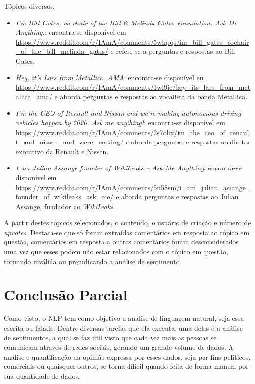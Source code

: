 Tópicos diversos.
\begin{itemize}
  \item
  \textit{I’m Bill Gates, co-chair of the Bill \& Melinda Gates Foundation. Ask
  Me Anything.}: encontra-se disponível em
  \url{https://www.reddit.com/r/IAmA/comments/5whpqs/im_bill_gates_cochair_of_the_bill_melinda_gates/}
  e refere-se a perguntas e respostas ao Bill Gates.
  \item
  \textit{Hey, it's Lars from Metallica. AMA}: encontra-se disponível em
  \url{https://www.reddit.com/r/IAmA/comments/1wl9ic/hey_its_lars_from_metallica_ama/}
  e aborda perguntas e respostas ao vocalista da banda Metallica.
  
  \item
  \textit{I'm the CEO of Renault and Nissan and we're making autonomous driving
  vehicles happen by 2020. Ask me anything!}: encontra-se disponível em
  \url{https://www.reddit.com/r/IAmA/comments/2s7obx/im_the_ceo_of_renault_and_nissan_and_were_making/}
  e aborda perguntas e respostas ao diretor executivo da Renault e Nissan.
  
  \item
  \textit{I am Julian Assange founder of WikiLeaks -- Ask Me Anything}:
  encontra-se disponível em
  \url{https://www.reddit.com/r/IAmA/comments/5n58sm/i_am_julian_assange_founder_of_wikileaks_ask_me/}
  e aborda perguntas e respostas ao Julian Assange, fundador do
  \textit{WikiLeaks}.
  
\end{itemize}


A partir destes tópicos selecionados, o conteúdo, o usuário de criação e número
de \textit{upvotes}. Destaca-se que só foram extraídos comentários
em resposta ao tópico em questão, comentários em resposta a outros comentários
foram desconsiderados uma vez que esses podem não estar relacionados com o
tópico em questão, tornando inválida ou prejudicando a análise de sentimento.


\chapter{Conclusão Parcial}

Como visto, o \ac{NLP} tem como objetivo a analise de linguagem natural, seja
essa escrita ou falada. Dentre diversas tarefas que ela executa, uma delas é a
análise de sentimentos, a qual se faz útil visto que cada vez
mais as pessoas se comunicam através de redes sociais, gerando um grande volume
de dados. A análise e quantificação da opinião expressa por esses dados, seja
por fins políticos, comerciais ou quaisquer outros, se torna díficil quando
feita de forma manual por sua quantidade de dados.

